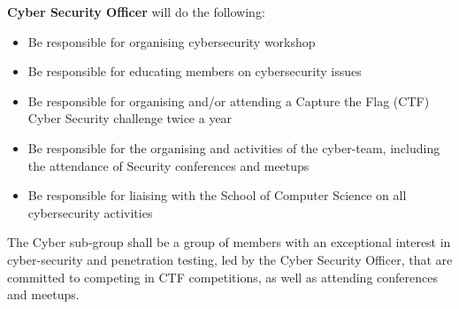 \begin{subclause}
  \textbf{Cyber Security Officer} will do the following: 
  \begin{itemize}[label=--,topsep=0em,itemsep=0em]
      \item Be responsible for organising cybersecurity workshop
      \item Be responsible for educating members on cybersecurity issues
      \item Be responsible for organising and/or attending a Capture the Flag (CTF) Cyber Security challenge twice a year
      \item Be responsible for the organising and activities of the cyber-team, including the attendance of Security conferences and meetups
      \item Be responsible for liaising with the School of Computer Science on all cybersecurity activities
  \end{itemize}
\end{subclause}

\begin{clause}  
  The Cyber sub-group shall be a group of members with an exceptional interest in cyber-security and penetration testing, led by the Cyber Security Officer, that are committed to competing in CTF competitions, as well as attending conferences and meetups.
\end{clause}
